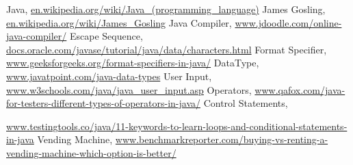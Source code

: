 \documentclass[openany]{book}  %
\begin{document}
% 
% 
\printindex
% 
% 
\begin{thebibliography}{90}
    \footnotesize
     Java, \url{en.wikipedia.org/wiki/Java_(programming_language)}
     James Gosling, \url{en.wikipedia.org/wiki/James_Gosling}
     Java Compiler, \url{www.jdoodle.com/online-java-compiler/}
     Escape Sequence, \url{docs.oracle.com/javase/tutorial/java/data/characters.html}
     Format Specifier,  \footnotesize{\url{www.geeksforgeeks.org/format-specifiers-in-java/}}
     DataType, \url{www.javatpoint.com/java-data-types}
     User Input, \url{www.w3schools.com/java/java_user_input.asp}
     Operators, \url{www.qafox.com/java-for-testers-different-types-of-operators-in-java/}
     Control Statements, \\ \raggedright{\url{www.testingtools.co/java/11-keywords-to-learn-loops-and-conditional-statements-in-java}}
     Vending Machine, \url{www.benchmarkreporter.com/buying-vs-renting-a-vending-machine-which-option-is-better/}
\end{thebibliography}






















\vspace*{\fill}
\end{document}
